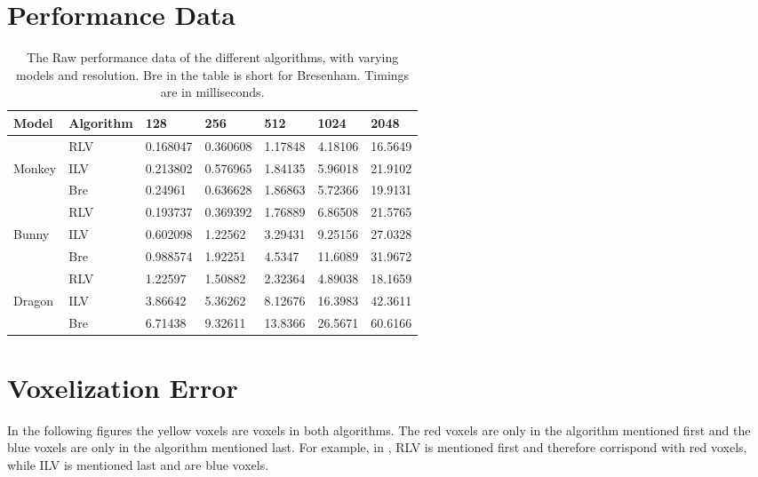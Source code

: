 \FloatBarrier

\section{Performance Data}\label{app:performance-data}
\begin{table}[h]
  \centering
\begin{tabular}{l|l|lllll}
  Model & Algorithm & 128 & 256 & 512 & 1024 & 2048 \\
  \hline
         & RLV & 0.168047 & 0.360608 & 1.17848 & 4.18106 & 16.5649 \\
  Monkey & ILV & 0.213802 & 0.576965 & 1.84135 & 5.96018 & 21.9102 \\
         & Bre & 0.24961 & 0.636628 & 1.86863 & 5.72366 & 19.9131 \\
  \hline
         & RLV & 0.193737 & 0.369392 & 1.76889 & 6.86508 & 21.5765 \\
  Bunny  & ILV & 0.602098 & 1.22562 & 3.29431 & 9.25156 & 27.0328 \\
         & Bre & 0.988574 & 1.92251 & 4.5347 & 11.6089 & 31.9672 \\
  \hline
         & RLV & 1.22597 & 1.50882 & 2.32364 & 4.89038 & 18.1659 \\
  Dragon & ILV & 3.86642 & 5.36262 & 8.12676 & 16.3983 & 42.3611 \\
         & Bre & 6.71438 & 9.32611 & 13.8366 & 26.5671 & 60.6166 \\
\end{tabular}
\caption{The Raw performance data of the different algorithms, with varying models and resolution. Bre in the table is short for Bresenham. Timings are in milliseconds.}
\end{table}


\section{Voxelization Error}\label{app:compare-error}
In the following figures the yellow voxels are voxels in both algorithms. The red voxels are only in the algorithm mentioned first and the blue voxels are only in the algorithm mentioned last. 
For example, in , RLV is mentioned first and therefore corrispond with red voxels, while ILV is mentioned last and are blue voxels. 


